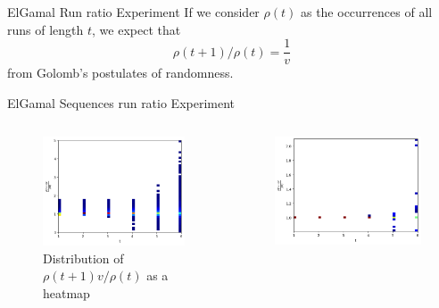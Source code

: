 

\begin{frame}{ElGamal Run ratio Experiment}
    If we consider $\rho(t)$ as the occurrences of all runs of length $t$, we expect that 
    $$ \rho(t+1)/\rho(t) = \frac{1}{v} $$
    from Golomb's postulates of randomness.
\end{frame}

\begin{frame}{ElGamal Sequences run ratio Experiment}
    \begin{columns}
        \begin{column}{0.45\textwidth}
            \begin{figure}
                \centering
                \includegraphics[width=\textwidth]{figures/AllDataNormalizedrunratio.png}
                \caption{Distribution of $\rho(t+1)v/\rho(t)$ as a heatmap}
            \end{figure}
        \end{column}
        \begin{column}{0.45\textwidth}
            \begin{figure}
                \centering
                \includegraphics[width=\textwidth]{figures/AllDataAndvisGenNormalizedrunratio.png}

\end{figure}
\end{column}
\end{columns}
\end{frame}
